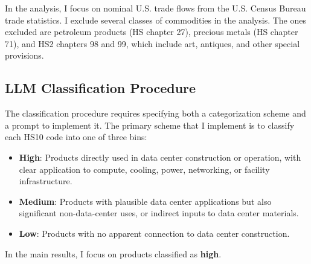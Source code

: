 \documentclass[12pt,pdftex]{article}
\begin{document}
\begin{onehalfspacing}
In the analysis, I focus on nominal U.S. trade flows from the U.S. Census Bureau trade statistics. I exclude several classes of commodities in the analysis. The ones excluded are petroleum products (HS chapter 27), precious metals (HS chapter 71), and HS2 chapters 98 and 99, which include art, antiques, and other special provisions. 

\subsection*{LLM Classification Procedure}

The classification procedure requires specifying both a categorization scheme and a prompt to implement it. The primary scheme that I implement is to classify each HS10 code into one of three bins:
\begin{itemize}
    \item \textbf{High}: Products directly used in data center construction or operation, with clear application to compute, cooling, power, networking, or facility infrastructure.
    \item \textbf{Medium}: Products with plausible data center applications but also significant non-data-center uses, or indirect inputs to data center materials.
    \item \textbf{Low}: Products with no apparent connection to data center construction.
\end{itemize}
In the main results, I focus on products classified as \textbf{high}. 


\end{onehalfspacing}
\end{document}
